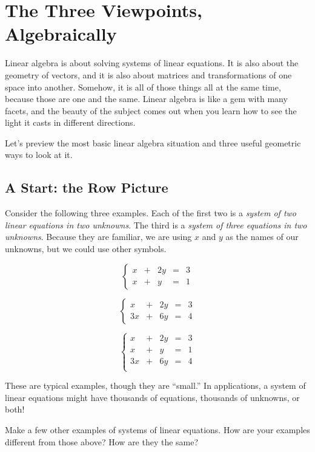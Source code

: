\documentclass[elementsmain.tex]{subfiles}
\begin{document}
\section{The Three Viewpoints, Algebraically}

Linear algebra is about solving systems of linear equations. It is also about the geometry of vectors, and it is also about matrices and transformations of one space into another. Somehow, it is all of those things all at the same time, because those are one and the same. Linear algebra is like a gem with many facets, and the beauty of the subject comes out when you learn how to see the light it casts in different directions.

Let's preview the most basic linear algebra situation and three useful geometric ways to look at it.


\subsection*{A Start: the Row Picture}

Consider the following three examples. Each of the first two is a \emph{system of two linear equations in two unknowns}. The third is a \emph{system of three equations in two unknowns}. Because they are familiar, we are using $x$ and $y$ as the names of our unknowns, but we could use other symbols.

\[ \tag{A}\label{eq:A}
\left\{ \begin{array}{rrrrr} 
x & + & 2y & = & 3 \\
 x & + & y & = & 1
\end{array}\right.
\]

\[ \tag{B}\label{eq:B}
\left\{ \begin{array}{rrrrr} 
x & + & 2y & = & 3 \\
3x & + & 6y & = &4
\end{array}\right.
\]

\[ \tag{C}\label{eq:C}
\left\{ \begin{array}{rrrrr}
x & + & 2y & = & 3 \\
 x & + & y & = & 1 \\
3x & + & 6y & = & 4 \\
\end{array}\right.
\]


These are typical examples, though they are ``small.'' In applications, a system of linear equations might have thousands of equations, thousands of unknowns, or both! 

\begin{readingex}
Make a few other examples of systems of linear equations. How are your examples different from those above? How are they the same?
\end{readingex}
\end{document}
